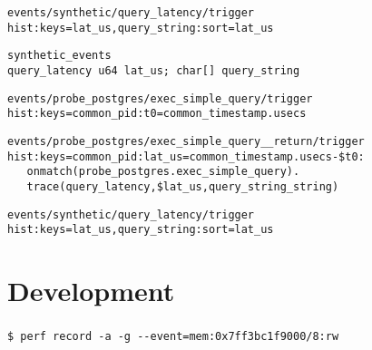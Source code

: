 \documentclass[usenames,dvipsnames, 18pt, compress, aspectratio=169]{beamer}
\begin{document}
\begin{frame}[fragile]{}
\begin{center}
\begin{overprint}[14.5cm]
		\vspace{-0.73cm}
        \begin{verbatim}
events/synthetic/query_latency/trigger
hist:keys=lat_us,query_string:sort=lat_us
        \end{verbatim}

        \begin{verbatim}
synthetic_events
query_latency u64 lat_us; char[] query_string
        \end{verbatim}

		\vspace{-0.73cm}
        \begin{verbatim}
events/probe_postgres/exec_simple_query/trigger
hist:keys=common_pid:t0=common_timestamp.usecs
        \end{verbatim}

		\vspace{-0.73cm}
        \begin{verbatim}
events/probe_postgres/exec_simple_query__return/trigger
hist:keys=common_pid:lat_us=common_timestamp.usecs-$t0:
   onmatch(probe_postgres.exec_simple_query).
   trace(query_latency,$lat_us,query_string_string)
        \end{verbatim}

		\vspace{-0.73cm}
        \begin{verbatim}
events/synthetic/query_latency/trigger
hist:keys=lat_us,query_string:sort=lat_us
        \end{verbatim}

    \end{overprint}

    \end{center}
\end{frame}

\section{Development}

\begin{frame}[fragile]{}
    \frametitle{}
    \begin{center}
        \begin{verbatim}
$ perf record -a -g --event=mem:0x7ff3bc1f9000/8:rw
        \end{verbatim}
    \end{center}
\end{frame}
\end{document}
